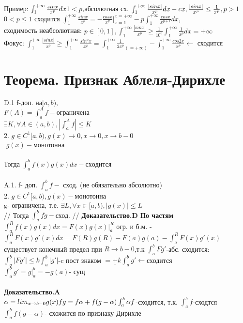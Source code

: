 \documentclass[12pt, a4paper]{article}
\begin{document}
	Пример: $ \int_1^{+\infty} \frac{sinx}{x^p} dx\\
	1<p, $абсолютная сх. $ \int_1^{+\infty} \frac{|sinx|}{x^p}dx - cx, \frac{|sinx|}{x^p} \leq \frac{1}{x^p}, p>1\\ $
	\\
	$ 0<p\leq 1 $ сходится $ \int_1^{+\infty} \frac{sinx}{x^p}= -\frac{cosx}{x^p}|_{x=1}^{x=+\infty} -p \int_1^{+\infty} \frac{cosx}{x^{p+1}}dx $, \\
	сходимость неабсолютная: $ p \in [0,1], \int_1^{+\infty}\frac{|sinx|}{x^p}\geq \frac{1}{10^6}\int_1^{+\infty} \frac{1}{x^p}dx =+\infty $\\
	Фокус: $ \int_1^{+\infty} \frac{|sinx|}{x^p}\geq \int_1^{+\infty}\frac{sin^2x}{x^p}=\int_1^{+\infty}\frac{1}{2x^p}_{(=+\infty)}-\int_1^{+\infty}\frac{cos2x}{x^p} \leftarrow$ сходится\\
	\section{Теорема. Признак Аблеля-Дирихле}
	D.1 f-доп. на$ [a,b),$ \\
	$\boxed{F(A) = \int_a^A f-ограничена }$\\
	$ \exists K, \forall A \in (a,b), |\int_a^A f| \leq K $\\
	2. $ g \in C^1[a,b), g(x) \rightarrow 0, x\rightarrow 0, x\rightarrow b - 0$\\$  $
	$ g(x)- $монотонна\\
	\\
	Тогда $\boxed{ \int_a^bf(x)g(x)dx-  сходится}$\\
	\\
	A.1. f- доп.  $ \int_a^b f - $ сход. (не обязательно абсолютно)\\
	2. $ g \in C^1 [a,b), g(x)- $монотонна\\
	g- ограничена, т.е. $ \exists L, \forall x \in  [a,b), |g(x)|\leq L $\\
	//
	Тогда $\int_a^b fg- $сход.
	//     
	\textbf{Доказательство.D По частям}\\
	$ \int_a^R f(x)g(x)dx =F(x)g(x)|_a^R$ огр. и б.м. -$ \int_a^R F(x)g'(x)dx =F(R)g(R)-F(a)g(a) -\int_a^R F(x)g'(x) $ существует конечный предел при $ R \rightarrow b - 0 $,т.к $ \int_a^b Fg'$-абс. сходится:\\  $ \int_a^b |Fg'| \leq k \int_a^b|g'| $-c пост знаком $ = \underline{+} k \int_a^b g' \leftarrow$сходится \\ 
	$ \int_a^b g' = g|_a^b= -g(a) $- сущ \\
	\\
	\textbf{Доказательство.A}\\
	$ \alpha = lim_{x \rightarrow b - 0} g(x)\\
	fg=f \alpha + f(g-\alpha)\\
	\int_a^b \alpha f  $-сходится, т.к. $\int_a^b f  $-сходтся\\
	$ \int_a^b  f(g - \alpha) $-  схожится по признаку Дирихле\\
	
\end{document}
